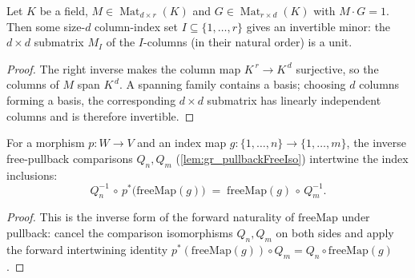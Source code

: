 \begin{lemma}
  \label{lem:gr_exists_isUnit_submatrix}
  Let \(K\) be a field, \(M \in \operatorname{Mat}_{d\times r}(K)\) and
  \(G \in \operatorname{Mat}_{r\times d}(K)\) with \(M \cdot G = 1\). Then some size-\(d\)
  column-index set \(I \subseteq \{1,\dots,r\}\) gives an invertible minor: the \(d \times d\)
  submatrix \(M_I\) of the \(I\)-columns (in their natural order) is a unit.
\end{lemma}
\begin{proof}
  The right inverse makes the column map \(K^{\,r} \to K^{\,d}\) surjective, so the columns of
  \(M\) span \(K^{\,d}\). A spanning family contains a basis; choosing \(d\) columns forming a
  basis, the corresponding \(d \times d\) submatrix has linearly independent columns and is
  therefore invertible.
\end{proof}

\begin{lemma}
  \label{lem:gr_pullbackFreeIso_inv_freeMap}
  For a morphism \(p : W \to V\) and an index map \(g : \{1,\dots,n\} \to \{1,\dots,m\}\), the
  inverse free-pullback comparisons \(Q_n, Q_m\) (\cref{lem:gr_pullbackFreeIso}) intertwine the
  index inclusions:
  \[
    Q_n^{-1} \,\circ\, p^{*}\bigl(\mathrm{freeMap}(g)\bigr)
      \;=\; \mathrm{freeMap}(g) \,\circ\, Q_m^{-1}.
  \]
\end{lemma}
\begin{proof}
  This is the inverse form of the forward naturality of \(\mathrm{freeMap}\) under pullback:
  cancel the comparison isomorphisms \(Q_n, Q_m\) on both sides and apply the forward
  intertwining identity \(p^{*}(\mathrm{freeMap}(g))\circ Q_m = Q_n \circ \mathrm{freeMap}(g)\).
\end{proof}

